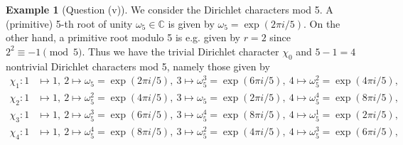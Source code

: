 \documentclass{scrartcl}
\newcommand{\C}{\mathbb{C}}
\theoremstyle{definition}
\newtheorem{example}[definition]{Example}
\begin{document}
\begin{example}[Question (v)]
    \label{ex:nontrivial_dirichlet_characters_mod_5}
    We consider the Dirichlet characters mod 5.
    A (primitive) 5-th root of unity $\omega_5 \in \C$ is given by $\omega_5 = \exp(2\pi i/5)$.
    On the other hand, a primitive root modulo 5 is e.g. given by $r = 2$ since $2^2 \equiv -1 \pmod 5$.
    Thus we have the trivial Dirichlet character $\chi_0$ and $5 - 1 = 4$ nontrivial Dirichlet characters mod 5, namely those given by
    \begin{align*}
        \chi_1: 1 &\mapsto 1,\ 2 \mapsto \omega_5 = \exp(2\pi i/5),\ 3 \mapsto \omega_5^3 = \exp(6\pi i/5),\ 4 \mapsto \omega_5^2 = \exp(4\pi i/5),\ \\
        \chi_2: 1 &\mapsto 1,\ 2 \mapsto \omega_5^2 = \exp(4\pi i/5),\ 3 \mapsto \omega_5 = \exp(2\pi i/5),\ 4 \mapsto \omega_5^4 = \exp(8\pi i/5),\ \\
        \chi_3: 1 &\mapsto 1,\ 2 \mapsto \omega_5^3 = \exp(6\pi i/5),\ 3 \mapsto \omega_5^4 = \exp(8\pi i/5),\ 4 \mapsto \omega_5^1 = \exp(2\pi i/5),\ \\
        \chi_4: 1 &\mapsto 1,\ 2 \mapsto \omega_5^4 = \exp(8\pi i/5),\ 3 \mapsto \omega_5^2 = \exp(4\pi i/5),\ 4 \mapsto \omega_5^3 = \exp(6\pi i/5),\ \\
    \end{align*}
\end{example}
\end{document}
